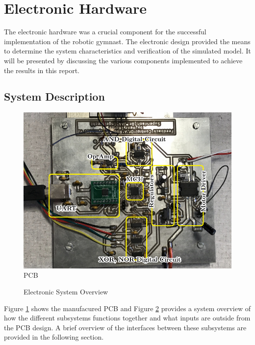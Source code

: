 \section{Electronic Hardware}
\label{sec:electronic_hardware}
The electronic hardware was a crucial component for the successful implementation of the robotic gymnast. The electronic design provided the means to determine the system characteristics and verification of the simulated model. It will be presented by discussing the various components implemented to achieve the results in this report.

\subsection{System Description}

\begin{figure}[h]
	\centering
	\includegraphics{./figs/PCB_layout/PCB.pdf}
	\caption{PCB}
	\label{fig:pcb}
\end{figure}


\begin{figure}[h]
	\centering
	
	\caption{Electronic System Overview}
	\label{fig:electronicSystemOverview}
\end{figure}



Figure \ref{fig:pcb} shows the manufacured PCB and Figure \ref{fig:electronicSystemOverview} provides a system overview of how the different subsystems functions together and what inputs are outside from the PCB design. A brief overview of the interfaces between these subsystems are provided in the following section.\\

